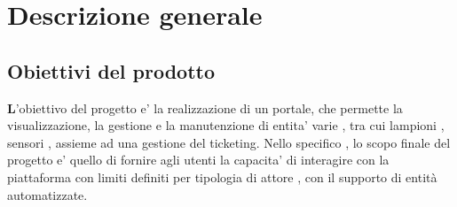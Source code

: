 \chapter{Descrizione generale}

\section{Obiettivi del prodotto}

\textbf L’obiettivo del progetto e' la realizzazione di un portale, che permette la visualizzazione, la gestione e la manutenzione
di entita' varie , tra cui lampioni , sensori , assieme ad una gestione del ticketing.
Nello specifico , lo scopo finale del progetto e' quello di fornire agli utenti la capacita' di interagire con la
piattaforma con limiti definiti per tipologia di attore , con il supporto di entità automatizzate.
